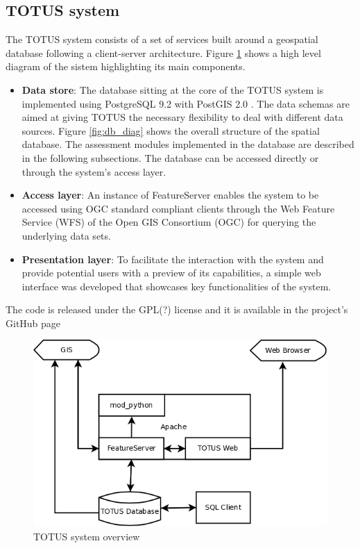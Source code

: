 
\subsection*{TOTUS system}
The TOTUS system consists of a set of services built around a geospatial database following a client-server architecture. Figure \ref{fig:system_diag} shows a high level diagram of the sistem highlighting its main components.
\begin{itemize}
	\item \textbf{Data store}: The database sitting at the core of the TOTUS system is implemented using PostgreSQL 9.2 \cite{pgsql} with PostGIS 2.0 \cite{postgis}. The data schemas are aimed at giving TOTUS the necessary flexibility to deal with different data sources. Figure \ref{fig:db_diag} shows the overall structure of the spatial database. The assessment modules implemented in the database are described in the following subsections. The database can be accessed directly or through the system's access layer.
	\item \textbf{Access layer}: An instance of FeatureServer\cite{dummy_temp} enables the system to be accessed using OGC standard compliant clients through the Web Feature Service (WFS) of the Open GIS
	Consortium (OGC) for querying the underlying data sets.
	\item \textbf{Presentation layer}: To facilitate the interaction with the system and provide potential users with a preview of its capabilities, a simple web interface was developed that showcases key functionalities of the system.
\end{itemize}

The code is released under the GPL(?) license and it is available in the project's GitHub page

\begin{figure}
	\caption{TOTUS system overview}
	\label{fig:system_diag}
	\includegraphics[width = 12cm]{system.png}
\end{figure}


